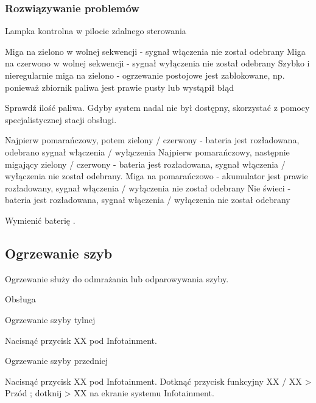 \subsubsection{Rozwiązywanie problemów}

Lampka kontrolna w pilocie zdalnego sterowania
\begin{itemizeTriangle}
	\itemTriangle Miga na zielono w wolnej sekwencji - sygnał włączenia nie został odebrany
	\itemTriangle Miga na czerwono w wolnej sekwencji - sygnał wyłączenia nie został odebrany
	\itemTriangle Szybko i nieregularnie miga na zielono - ogrzewanie postojowe jest zablokowane, np. ponieważ zbiornik paliwa jest prawie pusty lub wystąpił błąd
	\begin{itemizeArrow}
		\itemArrow Sprawdź ilość paliwa.
		\itemArrow Gdyby system nadal nie był dostępny, skorzystać z pomocy specjalistycznej stacji obsługi.
	\end{itemizeArrow}
	\itemTriangle Najpierw pomarańczowy, potem zielony / czerwony - bateria jest rozładowana, odebrano sygnał włączenia / wyłączenia
	\itemTriangle Najpierw pomarańczowy, następnie migający zielony / czerwony - bateria jest rozładowana, sygnał włączenia / wyłączenia nie został odebrany.
	\itemTriangle Miga na pomarańczowo - akumulator jest prawie rozładowany, sygnał włączenia / wyłączenia nie został odebrany
	\itemTriangle Nie świeci - bateria jest rozładowana, sygnał włączenia / wyłączenia nie został odebrany
	\begin{itemizeArrow}
		\itemArrow Wymienić baterię .
	\end{itemizeArrow}
\end{itemizeTriangle}

\subsection{Ogrzewanie szyb}

Ogrzewanie służy do odmrażania lub odparowywania szyby.

Obsługa

Ogrzewanie szyby tylnej

\begin{itemizeArrow}
	\itemArrow Nacisnąć przycisk XX pod Infotainment.
\end{itemizeArrow}

Ogrzewanie szyby przedniej

\begin{itemizeArrow}
	\itemArrow Nacisnąć przycisk XX pod Infotainment.
	\itemArrow Dotknąć przycisk funkcyjny XX / XX > Przód ; dotknij > XX na ekranie systemu Infotainment.
\end{itemizeArrow}

